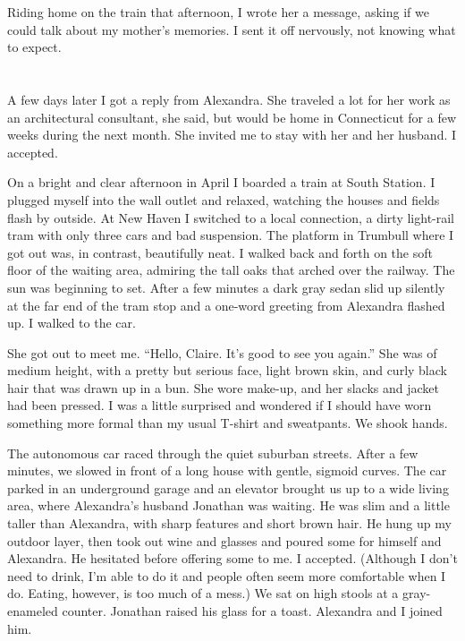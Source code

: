 \documentclass[10pt,b5paper]{article}
\begin{document}
Riding home on the train that afternoon, I wrote her a message, asking
if we could talk about my mother's memories. I sent it off nervously,
not knowing what to expect.

\section{}

A few days later I got a reply from Alexandra. She traveled a lot for
her work as an architectural consultant, she said, but would be home
in Connecticut for a few weeks during the next month. She invited me
to stay with her and her husband. I accepted.

On a bright and clear afternoon in April I boarded a train at South
Station.  I plugged myself into the wall outlet and relaxed, watching
the houses and fields flash by outside.  At New Haven I switched
to a local connection, a dirty light-rail tram with only three cars
and bad suspension.  The platform in Trumbull where I got out was,
in contrast, beautifully neat. I walked back and forth on the soft
floor of the waiting area, admiring the tall oaks that arched over
the railway. The sun was beginning to set. After a few minutes a dark
gray sedan slid up silently at the far end of the tram stop and a
one-word greeting from Alexandra flashed up. I walked to the car.

She got out to meet me. ``Hello, Claire. It's good to see you again.''
She was of medium height, with a pretty but serious face, light
brown skin, and curly black hair that was drawn up in a bun. She wore
make-up, and her slacks and jacket had been pressed. I was a little
surprised and wondered if I should have worn something more formal
than my usual T-shirt and sweatpants. We shook hands.

The autonomous car raced through the quiet suburban streets. After a
few minutes, we slowed in front of a long house with gentle, sigmoid
curves. The car parked in an underground garage and an elevator brought
us up to a wide living area, where Alexandra's husband Jonathan was
waiting.  He was slim and a little taller than Alexandra, with sharp
features and short brown hair.  He hung up my outdoor layer, then took
out wine and glasses and poured some for himself and Alexandra. He
hesitated before offering some to me. I accepted. (Although I don't
need to drink, I'm able to do it and people often seem more comfortable
when I do. Eating, however, is too much of a mess.)  We sat on high
stools at a gray-enameled counter. Jonathan raised his glass for a
toast. Alexandra and I joined him.
\end{document}
